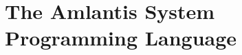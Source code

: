 
\part[The Amlantis System Programming Language]{The Amlantis System \\Programming Language \\ \vspace{1cm} }
\label{part:language-system}
















